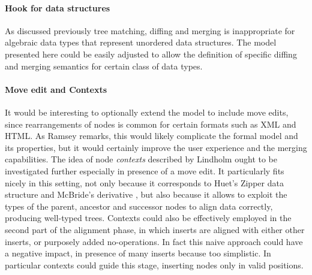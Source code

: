 \documentclass[../Thesis.tex]{subfiles}
\begin{document}
	\paragraph{Hook for data structures}
	As discussed previously tree matching, diffing and merging is
	inappropriate for algebraic data types that represent unordered data 
	structures. The model presented here could be easily adjusted
	to allow the definition of specific diffing and merging semantics 
	for certain class of data types.
	
	\paragraph{Move edit and Contexts}	
	It would be interesting to optionally extend the model to include move
	edits, since rearrangements of nodes is common for certain formats
	such as XML and HTML. As Ramsey remarks, this would 
	likely complicate the formal model and its properties, but it 
	would certainly improve the user experience and the merging
	capabilities.
	The idea of node \emph{contexts} described by Lindholm 
	\cite{Lind01} ought
	to be investigated further especially in presence of a move edit. 
	It particularly fits nicely in this setting, not only 
	because it corresponds to Huet's Zipper data structure \cite{Zipper} 
	and McBride's derivative \cite{Derivative}, but also because
	it allows to exploit the types of the parent, ancestor 
	and successor nodes to align data correctly, producing 
	well-typed trees.
	Contexts could also be effectively employed in the second part of the
	alignment phase, in which inserts are aligned with either other inserts,
	or purposely added no-operations. In fact this
	naive approach could have a negative impact, in presence of many inserts 
	because too simplistic. In particular contexts 
	could guide this stage, inserting nodes only in valid positions.
			
%	
% 	
		
\end{document}
